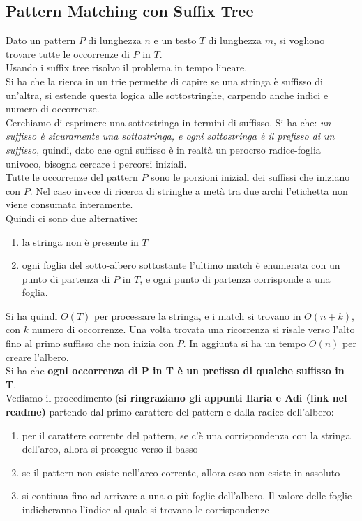 \documentclass[a4paper,12pt, oneside]{book}
\begin{document}
\subsection{Pattern Matching con Suffix Tree}
Dato un pattern $P$ di lunghezza $n$ e un testo $T$ di lunghezza $m$,
si vogliono trovare tutte le occorrenze di $P$ in $T$.\\
Usando i suffix tree risolvo il problema in tempo lineare.\\
Si ha che la rierca in un trie permette di capire se una stringa è
suffisso di un'altra, si estende questa logica alle sottostringhe,
carpendo anche indici e numero di occorrenze. \\
Cerchiamo di esprimere una sottostringa in termini di suffisso. Si ha
che: \textit{un suffisso è sicuramente una sottostringa, e ogni
sottostringa è il prefisso di un suffisso}, quindi, dato che ogni suffisso è
in realtà un perocrso radice-foglia univoco, bisogna cercare i
percorsi iniziali. \\
Tutte le occorrenze del pattern $P$ sono le porzioni iniziali dei
suffissi che iniziano con $P$. Nel caso invece di ricerca di stringhe
a metà tra due archi l’etichetta non viene consumata interamente.\\
Quindi ci sono due alternative:
\begin{enumerate}
  \item la stringa non è presente in $T$
  \item ogni foglia del sotto-albero sottostante l’ultimo match è
  enumerata con un punto di partenza di $P$ in $T$, e ogni punto di
  partenza corrisponde a una foglia. 
\end{enumerate}
Si ha quindi $O(T)$ per processare la stringa, e i match si trovano in
$O(n+k)$, con $k$ numero di occorrenze. Una volta trovata una
ricorrenza si risale verso l'alto fino al primo suffisso che non
inizia con $P$. In aggiunta si ha un tempo $O(n)$ per creare l'albero.\\
Si ha che \textbf{ogni occorrenza di P in T è un prefisso di qualche
  suffisso in T}.\\
Vediamo il procedimento (\textbf{si ringraziano gli appunti Ilaria e
  Adi (link nel readme)} partendo dal primo carattere del pattern e dalla radice dell’albero:
\begin{enumerate}
  \item per il carattere corrente del pattern, se c’è una
  corrispondenza con la stringa dell’arco, allora 
  si prosegue verso il basso
  \item se il pattern non esiste nell’arco corrente, allora esso non
  esiste in assoluto
  \item si continua fino ad arrivare a una o più foglie
  dell’albero. Il valore delle foglie indicheranno 
l’indice al quale si trovano le corrispondenze 
\end{enumerate}
\end{document}

